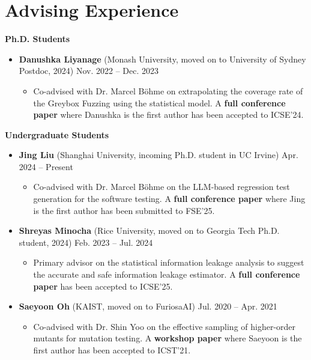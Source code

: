 \documentclass[letterpaper,11pt]{article}
\begin{document}
\section{Advising Experience}
\textbf{Ph.D. Students}\vspace{-4pt}
\begin{itemize}
  \item \textbf{Danushka Liyanage} (Monash University, moved on to University of Sydney Postdoc, 2024) \hfill Nov. 2022 -- Dec. 2023 \vspace{-6pt}
  \begin{itemize}[leftmargin=.5cm]
    \item[] Co-advised with Dr. Marcel Böhme on extrapolating the coverage rate of the Greybox Fuzzing using the statistical model. A \textbf{full conference paper} where Danushka is the first author has been accepted to ICSE'24.
  \end{itemize}
\end{itemize}

\textbf{Undergraduate Students}\vspace{-4pt}
\begin{itemize}
  \item \textbf{Jing Liu} (Shanghai University, incoming Ph.D. student in UC Irvine) \hfill Apr. 2024 -- Present \vspace{-6pt}
  \begin{itemize}[leftmargin=.5cm]
    \item[] Co-advised with Dr. Marcel Böhme on the LLM-based regression test generation for the software testing. A \textbf{full conference paper} where Jing is the first author has been submitted to FSE'25.
  \end{itemize}
  \item \textbf{Shreyas Minocha} (Rice University, moved on to Georgia Tech Ph.D. student, 2024) \hfill Feb. 2023 -- Jul. 2024 \vspace{-6pt}
  \begin{itemize}[leftmargin=.5cm]
    \item[] Primary advisor on the statistical information leakage analysis to suggest the accurate and safe information leakage estimator. A \textbf{full conference paper} has been accepted to ICSE'25.
  \end{itemize}
  \item \textbf{Saeyoon Oh} (KAIST, moved on to FuriosaAI) \hfill Jul. 2020 -- Apr. 2021 \vspace{-6pt}
  \begin{itemize}[leftmargin=.5cm]
    \item[] Co-advised with Dr. Shin Yoo on the effective sampling of higher-order mutants for mutation testing. A \textbf{workshop paper} where Saeyoon is the first author has been accepted to ICST'21.
  \end{itemize}
\end{itemize}
\end{document}
